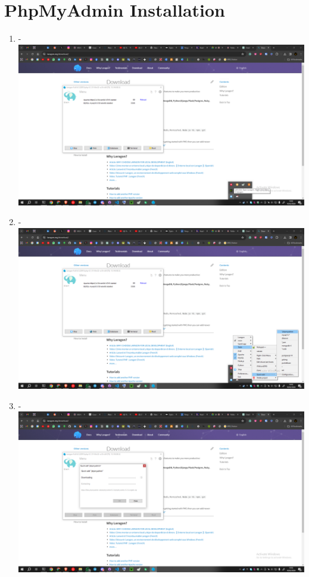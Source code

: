 \documentclass[12pt,titlepage]{article}
\begin{document}
\begin{enumerate}[label= \alph*.]
\end{enumerate}

\newpage

\section{PhpMyAdmin Installation}

\begin{enumerate}[label= \alph*.]
    \item - \\ \includegraphics[width=.9\textwidth]{images/figures/PHPMyAdmin 1.png}
    \item - \\ \includegraphics[width=.9\textwidth]{images/figures/PHPMyAdmin 2.png}
    \newpage
    \item - \\ \includegraphics[width=.9\textwidth]{images/figures/PHPMyAdmin 3.png}

\end{enumerate}
\end{document}
